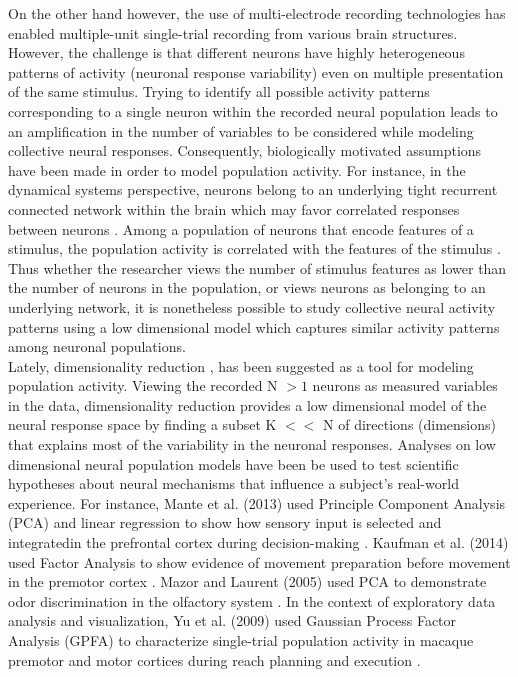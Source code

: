 On the other hand however, the use of multi-electrode \cite{Kipke2008} recording technologies has enabled  multiple-unit single-trial recording from various brain structures.\\
However, the challenge is that different neurons have highly heterogeneous patterns of activity (neuronal response variability) even on multiple presentation of the same stimulus. Trying to identify all possible activity patterns  corresponding to  a single neuron within the recorded neural population leads to an amplification in the number of variables to be considered while modeling collective neural responses. Consequently, biologically motivated assumptions have been made in order to model population activity. For instance, in the dynamical systems perspective, neurons belong to an underlying  tight recurrent connected network within the brain  which may favor correlated responses between neurons \cite{Shenoy2013}.
Among a population of neurons that encode features of a stimulus, the population activity is correlated with the features of the stimulus \cite{Georgopoulos1982, Hubel1968}.
Thus whether the researcher views the number of stimulus features as lower than the number of neurons in the population, or views neurons as belonging to an underlying network, it is nonetheless possible to study collective neural activity patterns using a low dimensional model which captures similar activity patterns among neuronal populations.\\

Lately, dimensionality reduction \cite{Cunningham2014a}, has been suggested as a tool for modeling population activity. Viewing the recorded N $>1$ neurons as measured variables in the data, dimensionality reduction provides a low dimensional model of the neural response space by finding a subset K $<<$ N of directions (dimensions) that explains most of the variability in the neuronal responses. Analyses on low dimensional neural population models have been be used to test scientific hypotheses about neural mechanisms that influence a subject's real-world experience. For instance, Mante et al. (2013) used Principle Component Analysis (PCA) and linear regression to show how sensory input is selected and integratedin the prefrontal cortex during decision-making   \cite{Vos2015}.  Kaufman et al. (2014) used Factor Analysis to show evidence of movement preparation before movement in the premotor cortex \cite{Kaufman2014}.  Mazor and Laurent (2005)  used PCA to demonstrate odor discrimination in the olfactory system \cite{Mazor2005}. In the context of exploratory data analysis and visualization, Yu et al. (2009) used Gaussian Process Factor Analysis (GPFA) to characterize single-trial population activity in  macaque premotor and motor cortices during reach planning and execution  \cite{Yu2009} .\\














